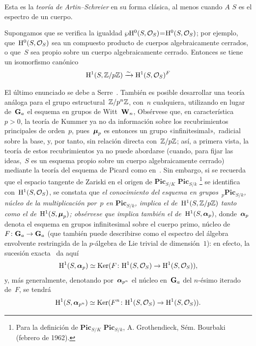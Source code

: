 Esta es la \emph{teoría de Artin--Schreier} en su forma clásica, al menos
cuando
{$A$}
{$S$}
es el espectro de un cuerpo.

\begin{corollaire}
\label{XI.6.10}
Supongamos que se verifica la igualdad
%
$\wp\mathrm H^0(S,\mathcal{O}_S)\mkern1mu{=}\mkern1mu\mathrm H^0(S,\mathcal{O}_S)$; por
ejemplo, que~$\mathrm H^0(S,\mathcal{O}_S)$ sea un
{compuesto}
{producto}
de cuerpos algebraicamente cerrados, o que~$S$ sea propio sobre un cuerpo
algebraicamente cerrado. Entonces se tiene un isomorfismo canónico
$$
\mathrm H^1(S,\mathbb Z/p\mathbb Z)\xrightarrow{\sim}\mathrm H^1(S,\mathcal{O}_S)^F
$$
\end{corollaire}

\begin{remarques}
\label{XI.6.11}
El último enunciado se debe a
%
Serre~\cite{XI.9}. También es posible desarrollar una teoría análoga para
el grupo estructural~$\mathbb Z/p^n\mathbb Z$, con~$n$ cualquiera, utilizando en lugar
de~$\mathbf{G}_a$ el esquema en grupos de Witt~$\mathbf{W}_n$, \cf \loccit Obsérvese que,
en característica~$p>0$, la teoría de Kummer ya no da información sobre los
recubrimientos principales de orden~$p$, pues~$\boldsymbol{\mu}_p$ es entonces un grupo
«infinitesimal», \,\ie radicial sobre la base, y, por tanto, sin relación
directa con~$\mathbb Z/p\mathbb Z$; así, a primera vista, la teoría de estos recubrimientos
ya no puede abordarse (cuando, para fijar las ideas,~$S$ es un esquema propio
sobre un cuerpo algebraicamente cerrado) mediante la teoría del esquema de
Picard como en~. Sin embargo, si se recuerda que el espacio
tangente de Zariski en el origen de
{$\mathbf{Pic}_{S/K}$}
{$\mathbf{Pic}_{S/k}$}
\kern1pt\footnote{Para la definición de
{$\mathbf{Pic}_{S/K}$}
{$\mathbf{Pic}_{S/k}$},
\cf A. Grothendieck, Sém. Bourbaki~ (febrero de 1962).} se identifica
con~$\mathrm H^1(S,\mathcal{O}_S)$, se constata que \emph{el conocimiento del esquema en
grupos~${_p}\mathbf{Pic}_{S/k}$, núcleo de la multiplicación por~$p$ en
$\mathbf{Pic}_{S/k}$, implica el de~$\mathrm H^1(S,\mathbb Z/p\mathbb Z)$ tanto como el
de~$\mathrm H^1(S,\boldsymbol{\mu}_p)$; obsérvese que implica también el
de~$\mathrm H^1(S,\boldsymbol{\alpha}_p)$}, donde~$\boldsymbol{\alpha}_p$ denota el esquema en grupos
infinitesimal sobre el cuerpo primo, núcleo de~$F\colon\mathbf{G}_a\to\mathbf{G}_a$ (que
también puede describirse como el espectro del álgebra envolvente restringida
de la $p$-álgebra de Lie trivial de dimensión~$1$): en efecto, la sucesión
exacta~ da aquí
$$
\mathrm H^1(S,\boldsymbol{\alpha}_p)\simeq\operatorname{Ker}
(F\colon\mathrm H^1(S,\mathcal{O}_S)\to\mathrm H^1(S,\mathcal{O}_S)),
$$
y, más generalmente, denotando por~$\boldsymbol{\alpha}_{p^n}$ el núcleo en~$\mathbf{G}_a$ del
$n$-ésimo iterado de~$F$, se tendrá
$$
\mathrm H^1(S,\boldsymbol{\alpha}_{p^n})\simeq\operatorname{Ker}(F^n\colon\mathrm H^1(S,\mathcal{O}_S)\to
\mathrm H^1(S,\mathcal{O}_S)).
$$


\end{remarques}
